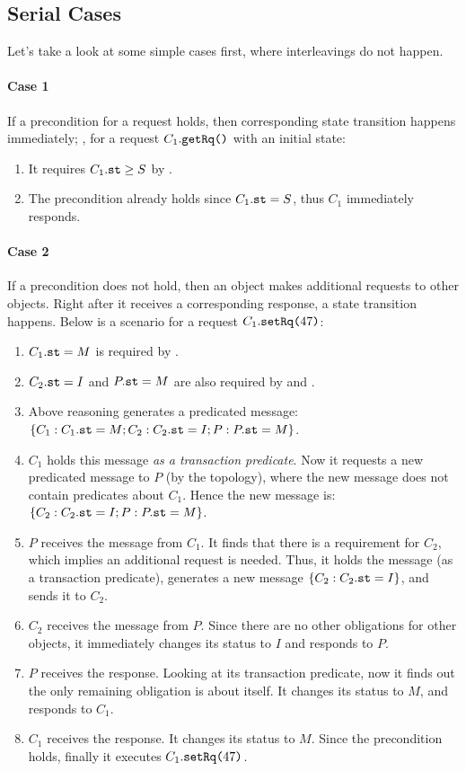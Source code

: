 \documentclass[format=manuscript]{acmart}
\begin{document}
\subsection{Serial Cases}\label{serial-cases}

Let's take a look at some simple cases first, where interleavings do not happen.

\paragraph{Case 1}
If a precondition for a request holds, then corresponding state transition
happens immediately; \eg{}, for a request $C_1.\texttt{getRq()}$ with an initial
state:

\begin{enumerate}
\item It requires $C_1.\texttt{st} \geq S$ by .
\item The precondition already holds since $C_1.\texttt{st} = S$, thus $C_1$
  immediately responds.
\end{enumerate}

\paragraph{Case 2}
If a precondition does not hold, then an object makes additional requests to
other objects. Right after it receives a corresponding response, a state
transition happens. Below is a scenario for a request $C_1.\texttt{setRq(}47\texttt{)}$:

\begin{enumerate}
\item $C_1.\texttt{st} = M$ is required by .
\item $C_2.\texttt{st} = I$ and $P.\texttt{st} = M$ are also required by  and
  .
\item Above reasoning generates a predicated message: $\{ C_1: C_1.\texttt{st} = M;
  C_2: C_2.\texttt{st} = I; P: P.\texttt{st} = M \}$.
\item $C_1$ holds this message \emph{as a transaction predicate}. Now it
  requests a new predicated message to $P$ (by the topology), where the new
  message does not contain predicates about $C_1$. Hence the new message is: $\{
  C_2: C_2.\texttt{st} = I; P: P.\texttt{st} = M \}$.
\item $P$ receives the message from $C_1$. It finds that there is a requirement
  for $C_2$, which implies an additional request is needed. Thus, it holds the
  message (as a transaction predicate), generates a new message $\{ C_2:
  C_2.\texttt{st} = I \}$, and sends it to $C_2$.
\item $C_2$ receives the message from $P$. Since there are no other obligations
  for other objects, it immediately changes its status to $I$ and responds to
  $P$.
\item $P$ receives the response. Looking at its transaction predicate, now it
  finds out the only remaining obligation is about itself. It changes its status
  to $M$, and responds to $C_1$.
\item $C_1$ receives the response. It changes its status to $M$. Since the
  precondition holds, finally it executes $C_1.\texttt{setRq(}47\texttt{)}$.
\end{enumerate}
\end{document}
